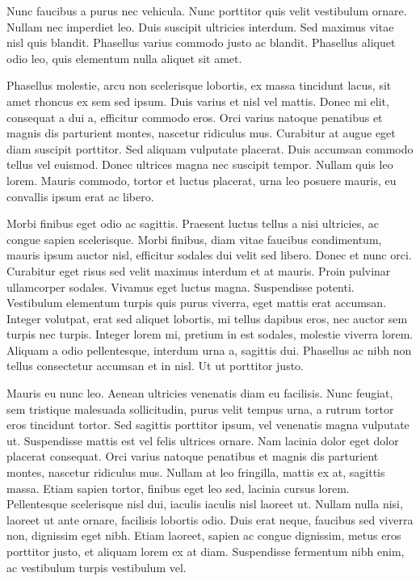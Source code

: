 \documentclass[a4paper,10pt,twoside]{article} %
\begin{document}
Nunc faucibus a purus nec vehicula.
Nunc porttitor quis velit vestibulum ornare.
Nullam nec imperdiet leo.
Duis suscipit ultricies interdum.
Sed maximus vitae nisl quis blandit.
Phasellus varius commodo justo ac blandit.
Phasellus aliquet odio leo, quis elementum nulla aliquet sit amet.

Phasellus molestie, arcu non scelerisque lobortis, ex massa tincidunt lacus, sit amet rhoncus ex sem sed ipsum.
Duis varius et nisl vel mattis.
Donec mi elit, consequat a dui a, efficitur commodo eros.
Orci varius natoque penatibus et magnis dis parturient montes, nascetur ridiculus mus.
Curabitur at augue eget diam suscipit porttitor.
Sed aliquam vulputate placerat.
Duis accumsan commodo tellus vel euismod.
Donec ultrices magna nec suscipit tempor.
Nullam quis leo lorem.
Mauris commodo, tortor et luctus placerat, urna leo posuere mauris, eu convallis ipsum erat ac libero.

Morbi finibus eget odio ac sagittis.
Praesent luctus tellus a nisi ultricies, ac congue sapien scelerisque.
Morbi finibus, diam vitae faucibus condimentum, mauris ipsum auctor nisl, efficitur sodales dui velit sed libero.
Donec et nunc orci.
Curabitur eget risus sed velit maximus interdum et at mauris.
Proin pulvinar ullamcorper sodales.
Vivamus eget luctus magna.
Suspendisse potenti.
Vestibulum elementum turpis quis purus viverra, eget mattis erat accumsan.
Integer volutpat, erat sed aliquet lobortis, mi tellus dapibus eros, nec auctor sem turpis nec turpis.
Integer lorem mi, pretium in est sodales, molestie viverra lorem.
Aliquam a odio pellentesque, interdum urna a, sagittis dui.
Phasellus ac nibh non tellus consectetur accumsan et in nisl.
Ut ut porttitor justo.

Mauris eu nunc leo.
Aenean ultricies venenatis diam eu facilisis.
Nunc feugiat, sem tristique malesuada sollicitudin, purus velit tempus urna, a rutrum tortor eros tincidunt tortor.
Sed sagittis porttitor ipsum, vel venenatis magna vulputate ut.
Suspendisse mattis est vel felis ultrices ornare.
Nam lacinia dolor eget dolor placerat consequat.
Orci varius natoque penatibus et magnis dis parturient montes, nascetur ridiculus mus.
Nullam at leo fringilla, mattis ex at, sagittis massa.
Etiam sapien tortor, finibus eget leo sed, lacinia cursus lorem.
Pellentesque scelerisque nisl dui, iaculis iaculis nisl laoreet ut.
Nullam nulla nisi, laoreet ut ante ornare, facilisis lobortis odio.
Duis erat neque, faucibus sed viverra non, dignissim eget nibh.
Etiam laoreet, sapien ac congue dignissim, metus eros porttitor justo, et aliquam lorem ex at diam.
Suspendisse fermentum nibh enim, ac vestibulum turpis vestibulum vel.
\end{document}
